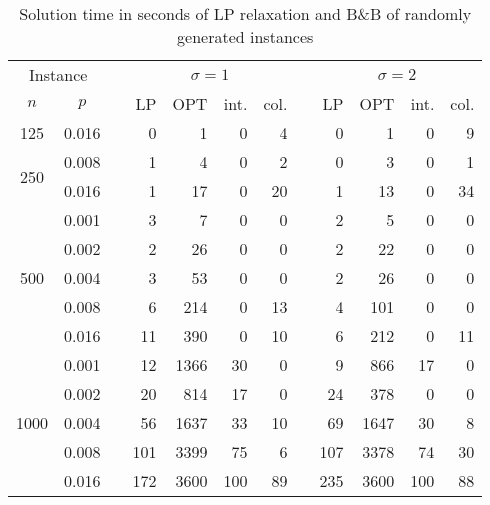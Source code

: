 \begin{table}[]
\begin{tabular}{ccrrrrrrrrrr}
\multicolumn{2}{c}{Instance} & & \multicolumn{4}{c}{$\sigma=1$} & &\multicolumn{4}{c}{$\sigma=2$} \\
\cline{1-2}\cline{4-7}\cline{9-12}
$n$ & $p$ & & LP  & OPT & int. & col.& & LP  & OPT & int. & col. \\
\hline
\multirow{1}{*}{125}       
 & 0.016 & &0   &  1 & 0 & 4 & & 0  &  1 &  0  &  9 \\
\hline                         
\multirow{2}{*}{250}                               
 & 0.008 & & 1  &  4 & 0 & 2 & & 0  &  3 & 0   & 1  \\
 & 0.016 & & 1  & 17 & 0 &20 & & 1  & 13 & 0   &34  \\
\hline                         
\multirow{5}{*}{500}                               
 & 0.001 & & 3   &  7 & 0 & 0 & & 2  &  5 & 0   & 0  \\
 & 0.002 & & 2   & 26 & 0 & 0 & & 2  & 22 & 0   & 0  \\
 & 0.004 & & 3   & 53 & 0 & 0 & & 2  & 26 & 0   & 0  \\
 & 0.008 & & 6   &214 & 0 &13 & & 4  &101 & 0   & 0  \\
 & 0.016 & &11   &390 & 0 &10 & & 6  &212 & 0   &11  \\
\hline                         
\multirow{5}{*}{1000}                               
 & 0.001 & & 12  &1366& 30& 0 & & 9  &866   & 17 & 0 \\
 & 0.002 & & 20  & 814& 17& 0 & & 24 &378   & 0  & 0 \\
 & 0.004 & & 56  &1637& 33&10 & & 69 &1647  & 30 & 8 \\
 & 0.008 & &101  &3399& 75& 6 & & 107&3378  & 74 &30 \\
 & 0.016 & &172  &3600&100&89 & & 235&3600  &100 &88 
\end{tabular}
\caption{Solution time in seconds of LP relaxation and B\&B of randomly generated instances}
\label{tab:soltime}
\end{table}
			 

